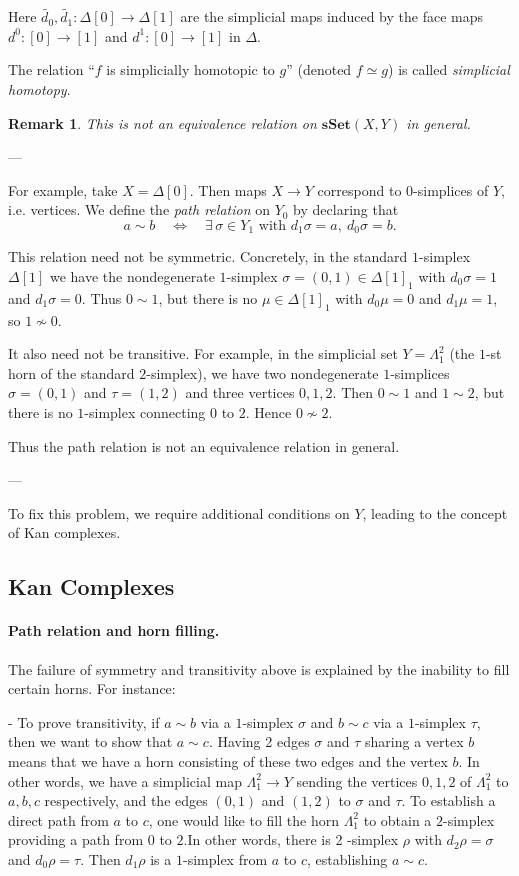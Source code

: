 \documentclass[11pt]{article}
\theoremstyle{definition}
\theoremstyle{plain}
\newtheorem{remark}[definition]{Remark}
\begin{document}
Here $\tilde{d_0}, \tilde{d_1} : \Delta[0] \to \Delta[1]$ are the simplicial maps induced by the face maps $d^0 : [0] \to [1]$ and $d^1 : [0] \to [1]$ in $\Delta$.

The relation ``$f$ is simplicially homotopic to $g$'' (denoted $f \simeq g$) is called \emph{simplicial homotopy}.

\begin{remark}
    This is not an equivalence relation on $\mathbf{sSet}(X,Y)$ in general.
\end{remark}

---

For example, take $X = \Delta[0]$. Then maps $X \to Y$ correspond to $0$-simplices of $Y$, i.e. vertices.
We define the \emph{path relation} on $Y_0$ by declaring that
\[
    a \sim b \quad \Longleftrightarrow \quad \exists \,\sigma \in Y_1 \text{ with } d_1\sigma = a, \ d_0\sigma = b.
\]

This relation need not be symmetric.
Concretely, in the standard $1$-simplex $\Delta[1]$ we have the nondegenerate $1$-simplex $\sigma = (0,1) \in \Delta[1]_1$ with $d_0\sigma = 1$ and $d_1\sigma = 0$. Thus $0 \sim 1$, but there is no $\mu \in \Delta[1]_1$ with $d_0\mu = 0$ and $d_1\mu = 1$, so $1 \not\sim 0$.

It also need not be transitive. For example, in the simplicial set $Y = \Lambda_1^2$ (the $1$-st horn of the standard $2$-simplex), we have two nondegenerate $1$-simplices $\sigma = (0,1)$ and $\tau = (1,2)$ and three vertices $0,1,2$. Then $0 \sim 1$ and $1 \sim 2$, but there is no $1$-simplex connecting $0$ to $2$. Hence $0 \not\sim 2$.

Thus the path relation is not an equivalence relation in general.

---

To fix this problem, we require additional conditions on $Y$, leading to the concept of Kan complexes.

\subsection{Kan Complexes}

\paragraph{Path relation and horn filling.}
The failure of symmetry and transitivity above is explained by the inability to fill certain horns.
For instance:

- To prove transitivity,  if $a \sim b$ via a $1$-simplex $\sigma$ and $b \sim c$ via a $1$-simplex $\tau$, then we want  to show that $a \sim c$. Having 2 edges $\sigma$ and $\tau$ sharing a vertex $b$ means that we have a horn consisting of these two edges and the vertex $b$.
In other words, we have a simplicial map $\Lambda^2_1 \to Y$ sending the vertices $0,1,2$ of $\Lambda^2_1$ to $a,b,c$ respectively, and the edges $(0,1)$ and $(1,2)$ to $\sigma$ and $\tau$.
To establish a direct path from $a$ to $c$,
one would like to fill the horn $\Lambda^2_1$ to obtain a $2$-simplex providing a path from $0$ to $2$.In other words, there is 2 -simplex $\rho$ with $d_2\rho = \sigma$ and $d_0\rho = \tau$. Then $d_1\rho$ is a $1$-simplex from $a$ to $c$, establishing $a \sim c$.
\end{document}
